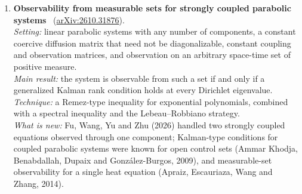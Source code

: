 \documentclass[11pt,a4paper]{article}
\newcommand{\ie}{\emph{i.e.},\ }
\begin{document}
\begin{enumerate}[leftmargin=*]
  \emph{Setting:} continuous-time Markov jump linear stochastic systems with known candidate modes but an unobserved Markov parameter process, so any stabilizing law must adapt; further regularity assumptions are not spelled out in the abstract.\\
  \emph{Main result:} global adaptive stabilizability holds if and only if the coupled Riccati equations that characterise stabilizability with the mode observed are solvable, \ie the weakest possible structural condition is the non-adaptive one.\\
  \emph{Technique:} not visible from the abstract beyond the coupled Riccati equations through which the condition is stated.\\
  \emph{What is new:} Fang and Loparo (2002) characterised non-adaptive mean-square stabilizability through coupled Riccati equations, and Xue and Guo (2001) showed that in discrete time adaptive stabilizability requires different coupled Riccati equations; here the two conditions coincide, so in continuous time not observing the mode costs nothing for stabilizability.\\
  \emph{Limitations:} single-author preprint; the regularity assumptions, and so the source of the gap with discrete time, could not be checked; nothing on transient performance or on how the adaptive law is built.\\
  \emph{Verdict:} a tight characterisation that also exposes a basic difference between continuous and discrete time; confidence medium (abstract only, full text unreachable).
  \item \textbf{Observability from measurable sets for strongly coupled parabolic systems}~\cite{chen2026observability} (\href{https://arxiv.org/abs/2610.31876}{arXiv:2610.31876}).\\
  \emph{Setting:} linear parabolic systems with any number of components, a constant coercive diffusion matrix that need not be diagonalizable, constant coupling and observation matrices, and observation on an arbitrary space-time set of positive measure.\\
  \emph{Main result:} the system is observable from such a set if and only if a generalized Kalman rank condition holds at every Dirichlet eigenvalue.\\
  \emph{Technique:} a Remez-type inequality for exponential polynomials, combined with a spectral inequality and the Lebeau--Robbiano strategy.\\
  \emph{What is new:} Fu, Wang, Yu and Zhu (2026) handled two strongly coupled equations observed through one component; Kalman-type conditions for coupled parabolic systems were known for open control sets (Ammar Khodja, Benabdallah, Dupaix and Gonz{\'a}lez-Burgos, 2009), and measurable-set observability for a single heat equation (Apraiz, Escauriaza, Wang and Zhang, 2014).\\

\end{enumerate}
\end{document}
